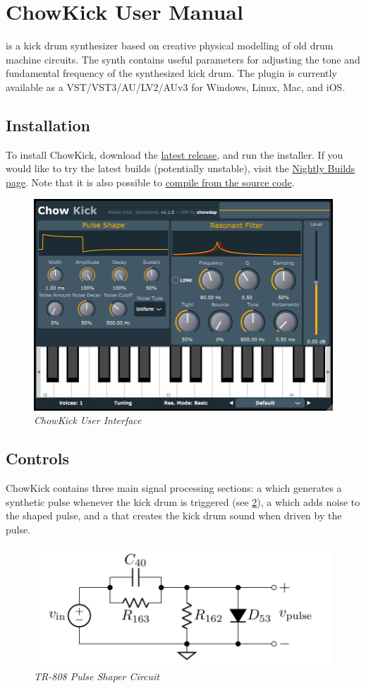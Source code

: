 \documentclass[landscape,twocolumn,a5paper]{manual}
\def\dllink#1{\href{https://chowdsp.com/products.html\#kick}{#1}}
\begin{document}
\section{ChowKick User Manual}

\noindent
{} is a kick drum synthesizer based
on creative physical modelling of old drum machine circuits.
The synth contains useful parameters for adjusting the tone
and fundamental frequency of the synthesized kick drum.
The plugin is currently available as a VST/VST3/AU/LV2/AUv3
for Windows, Linux, Mac, and iOS.

\subsection{Installation}
To install ChowKick, download the \dllink{latest release},
and run the installer. If you would like to try the
latest builds (potentially unstable), visit the
\href{https://chowdsp.com/nightly.html\#kick}{Nightly Builds page}.
Note that it is also possible to
\href{https://github.com/Chowdhury-DSP/ChowKick#Building}{compile from the source code}.

\begin{figure}[ht]
    \center
    \includegraphics[width=0.75\columnwidth]{screenshots/full_gui.png}
    \caption{\label{fig:full_gui}{\it ChowKick User Interface}}
\end{figure}

\subsection{Controls}
ChowKick contains three main signal processing sections:
a  which generates a synthetic
pulse whenever the kick drum is triggered (see \cref{fig:pulse_shaper}),
a  which adds noise to the shaped pulse,
and a  that creates the kick
drum sound when driven by the pulse.
%
\begin{figure}[ht]
    \center
    \includegraphics[width=0.65\columnwidth]{figures/pulse_shaper.png}
    \caption{\label{fig:pulse_shaper}{\it TR-808 Pulse Shaper Circuit}}
\end{figure}
\end{document}
